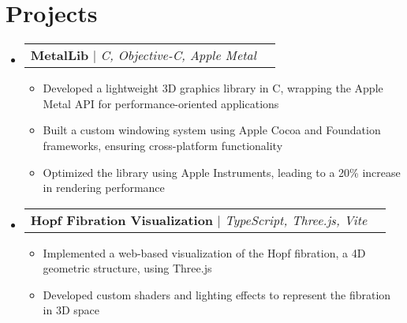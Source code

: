 \documentclass[letterpaper,11pt]{article}
\makeatletter
\newcommand{\resumeItem}[1]{\item\small{#1 \vspace{-2pt}}}
\newcommand{\resumeProjectHeading}[2]{
    \item
    \begin{tabular*}{0.97\textwidth}{l@{\extracolsep{\fill}}r}
      \small#1 & #2 \\
    \end{tabular*}\vspace{-7pt}
}
\newcommand{\resumeSubHeadingListStart}{\begin{itemize}[leftmargin=0.15in, label={}]}
\newcommand{\resumeSubHeadingListEnd}{\end{itemize}}
\newcommand{\resumeItemListStart}{\begin{itemize}}
\newcommand{\resumeItemListEnd}{\end{itemize}\vspace{-5pt}}
\makeatother
\begin{document}
\section{Projects}
    \resumeSubHeadingListStart
      \resumeProjectHeading
          {\textbf{MetalLib} $|$ \emph{C, Objective-C, Apple Metal}}{}
          \resumeItemListStart
            \resumeItem{Developed a lightweight 3D graphics library in C, wrapping the Apple Metal API for performance-oriented applications}
            \resumeItem{Built a custom windowing system using Apple Cocoa and Foundation frameworks, ensuring cross-platform functionality}
            \resumeItem{Optimized the library using Apple Instruments, leading to a 20\% increase in rendering performance}
          \resumeItemListEnd
        \resumeProjectHeading
            {\textbf{Hopf Fibration Visualization} $|$ \emph{TypeScript, Three.js, Vite}}{}
            \resumeItemListStart
                \resumeItem{Implemented a web-based visualization of the Hopf fibration, a 4D geometric structure, using Three.js}
                \resumeItem{Developed custom shaders and lighting effects to represent the fibration in 3D space}
            \resumeItemListEnd
    \resumeSubHeadingListEnd
\end{document}

